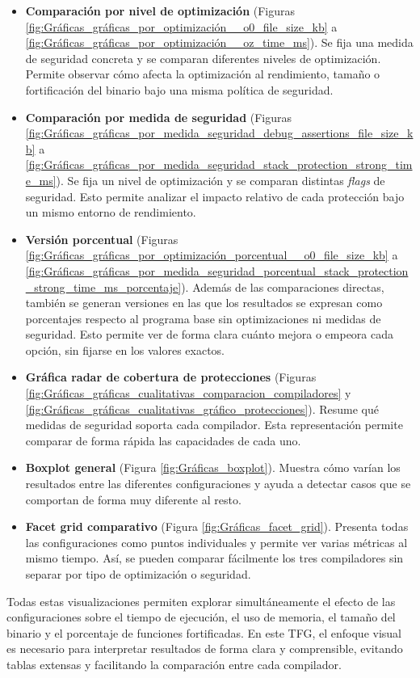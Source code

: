 \begin{itemize}
\item
  \textbf{Comparación por nivel de optimización} (Figuras \ref{fig:Gráficas_gráficas_por_optimización__o0_file_size_kb} a \ref{fig:Gráficas_gráficas_por_optimización__oz_time_ms}).
  Se fija una medida de seguridad concreta y se comparan diferentes
  niveles de optimización. Permite observar cómo afecta la optimización
  al rendimiento, tamaño o fortificación del binario bajo una misma
  política de seguridad.
\item
  \textbf{Comparación por medida de seguridad} (Figuras \ref{fig:Gráficas_gráficas_por_medida_seguridad_debug_assertions_file_size_kb} a \ref{fig:Gráficas_gráficas_por_medida_seguridad_stack_protection_strong_time_ms}).
  Se fija un nivel de optimización y se comparan distintas \emph{flags}
  de seguridad. Esto permite analizar el impacto relativo de cada
  protección bajo un mismo entorno de rendimiento.
\item
  \textbf{Versión porcentual} (Figuras \ref{fig:Gráficas_gráficas_por_optimización_porcentual__o0_file_size_kb} a \ref{fig:Gráficas_gráficas_por_medida_seguridad_porcentual_stack_protection_strong_time_ms_porcentaje}).
  Además de las comparaciones directas, también se generan versiones en
  las que los resultados se expresan como porcentajes respecto al
  programa base sin optimizaciones ni medidas de seguridad. Esto permite
  ver de forma clara cuánto mejora o empeora cada opción, sin fijarse en
  los valores exactos.
\item
  \textbf{Gráfica radar de cobertura de protecciones} (Figuras \ref{fig:Gráficas_gráficas_cualitativas_comparacion_compiladores} y \ref{fig:Gráficas_gráficas_cualitativas_gráfico_protecciones}).
  Resume qué medidas de seguridad soporta cada compilador. Esta
  representación permite comparar de forma rápida las capacidades de
  cada uno.
\item
  \textbf{Boxplot general} (Figura \ref{fig:Gráficas_boxplot}).
  Muestra cómo varían los resultados entre las diferentes
  configuraciones y ayuda a detectar casos que se comportan de forma muy
  diferente al resto.
\item
  \textbf{Facet grid comparativo} (Figura \ref{fig:Gráficas_facet_grid}).
  Presenta todas las configuraciones como puntos individuales y permite
  ver varias métricas al mismo tiempo. Así, se pueden comparar
  fácilmente los tres compiladores sin separar por tipo de optimización
  o seguridad.
\end{itemize}

Todas estas visualizaciones permiten explorar simultáneamente el efecto
de las configuraciones sobre el tiempo de ejecución, el uso de memoria,
el tamaño del binario y el porcentaje de funciones fortificadas.
En este TFG, el enfoque visual es necesario para interpretar resultados de forma
clara y comprensible, evitando tablas extensas y facilitando la
comparación entre cada compilador.